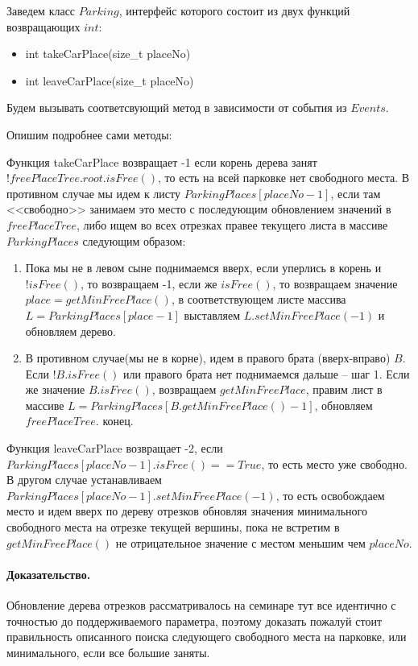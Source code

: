 \documentclass[12pt]{article}
\begin{document}
Заведем класс $ Parking $, интерфейс которого состоит из двух функций
возвращающих $ int $:
\begin{itemize}
    \item int takeCarPlace(size\_t placeNo)
    \item int leaveCarPlace(size\_t placeNo)
\end{itemize}
Будем вызывать соответсвующий метод в зависимости от события из $ Events $.

Опишим подробнее сами методы:

Функция takeCarPlace возвращает -1 если корень дерева занят
$ !freePlaceTree.root.isFree() $, то есть на всей парковке нет
свободного места. В противном случае мы идем к листу
$ ParkingPlaces[placeNo - 1] $, если там <<свободно>> занимаем это место с
последующим обновлением значений в $ freePlaceTree $,
либо ищем во всех отрезках правее текущего листа в массиве $ ParkingPlaces $
следующим образом:
\begin{enumerate}
    \item Пока мы не в левом сыне поднимаемся вверх, если уперлись в корень
          и $ !isFree() $, то возвращаем -1, если же $ isFree() $, то
          возвращаем значение $ place = getMinFreePlace() $, в
          соответствующем листе массива $ L = ParkingPlaces[place - 1] $
          выставляем $ L.setMinFreePlace(-1) $ и обновляем дерево.

    \item В противном случае(мы не в корне), идем в правого брата
          (вверх-вправо) $ B $. Если $ !B.isFree() $ или правого брата нет
          поднимаемся дальше -- шаг 1.
          Если же значение $ B.isFree() $, возвращаем $ getMinFreePlace $,
          правим лист в массиве $ L = ParkingPlaces[B.getMinFreePlace() - 1] $,
          обновляем $ freePlaceTree $. конец.
\end{enumerate}



Функция leaveCarPlace возвращает -2, если
$ ParkingPlaces[placeNo - 1].isFree() == True $, то есть место уже свободно.
В другом случае устанавливаем
$ ParkingPlaces[placeNo - 1].setMinFreePlace(-1)$, то есть освобождаем
место и идем вверх по дереву отрезков обновляя значения минимального
свободного места на отрезке текущей вершины, пока не встретим в
$ getMinFreePlace() $ не отрицательное значение с местом меньшим
чем $ placeNo $.



\paragraph{Доказательство.}
Обновление дерева отрезков рассматривалось на семинаре тут все идентично
с точностью до поддерживаемого параметра, поэтому доказать пожалуй стоит
правильность описанного поиска следующего свободного места на парковке, или
минимального, если все большие заняты.
\end{document}
